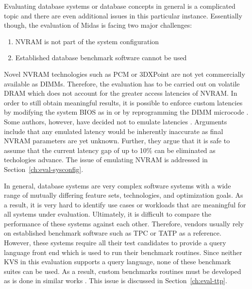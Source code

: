 Evaluating database systems or database concepts in general is a complicated
topic and there are even additional issues in this particular instance.
Essentially though, the evaluation of Midas is facing two major challenges:

\begin{enumerate}
    \item NVRAM is not part of the system configuration
    \item Established database benchmark software cannot be used
\end{enumerate}

Novel NVRAM technologies such as PCM or 3DXPoint are not yet commercially
available as DIMMs. Therefore, the evaluation has to be carried out on volatile
DRAM which does not account for the greater access latencies of NVRAM. In order
to still obtain meaningful results, it is possible to enforce custom latencies
by modifying the system BIOS as in \cite{dulloor2014system, oukid2015instant} or
by reprogramming the DIMM microcode \cite{schwalb2016hyrise}. Some authors,
however, have decided not to emulate latencies \cite{bailey2013exploring,
zhou2016nvht}. Arguments include that any emulated latency would be inherently
inaccurate as final NVRAM parameters are yet unknown. Further, they argue that
it is safe to assume that the current latency gap of up to 10\% can be
eliminated as techologies advance. The issue of emulating NVRAM is addressed in
Section~\ref{ch:eval-sysconfig}.

In general, database systems are very complex software systems with a wide range
of mutually differing feature sets, technologies, and optimization goals. As a
result, it is very hard to identify use cases or workloads that are meaningful
for all systems under evaluation. Ultimately, it is difficult to compare the
performance of these systems against each other. Therefore, vendors usually rely
on established benchmark software such as TPC \cite{schwalb2016hyrise} or TATP
\cite{oukid2015instant} as a reference. However, these systems require all their
test candidates to provide a query language front end which is used to run their
benchmark routines. Since neither KVS in this evaluation supports a query
language, none of these benchmark suites can be used. As a result, custom
benchmarks routines must be developed as is done in similar works
\cite{bailey2013exploring, zhou2016nvht}. This issue is discussed in
Section~\ref{ch:eval-ttp}.

